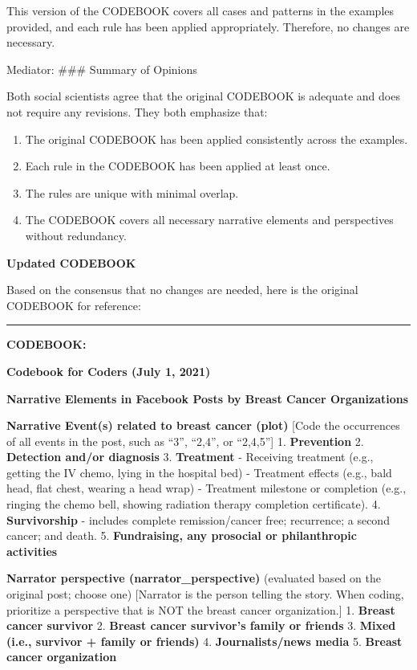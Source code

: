This version of the CODEBOOK covers all cases and patterns in the
examples provided, and each rule has been applied appropriately.
Therefore, no changes are necessary.

Mediator: \#\#\# Summary of Opinions

Both social scientists agree that the original CODEBOOK is adequate and
does not require any revisions. They both emphasize that:

\begin{enumerate}
\def\labelenumi{\arabic{enumi}.}
\tightlist
\item
  The original CODEBOOK has been applied consistently across the
  examples.
\item
  Each rule in the CODEBOOK has been applied at least once.
\item
  The rules are unique with minimal overlap.
\item
  The CODEBOOK covers all necessary narrative elements and perspectives
  without redundancy.
\end{enumerate}

\textbf{Updated CODEBOOK}

Based on the consensus that no changes are needed, here is the original
CODEBOOK for reference:

\begin{center}\rule{0.5\linewidth}{0.5pt}\end{center}

\textbf{CODEBOOK:}

\textbf{Codebook for Coders (July 1, 2021)}

\textbf{Narrative Elements in Facebook Posts by Breast Cancer
Organizations}

\textbf{Narrative Event(s) related to breast cancer (plot)} {[}Code the
occurrences of all events in the post, such as ``3'', ``2,4'', or
``2,4,5''{]} 1. \textbf{Prevention} 2. \textbf{Detection and/or
diagnosis} 3. \textbf{Treatment} - Receiving treatment (e.g., getting
the IV chemo, lying in the hospital bed) - Treatment effects (e.g., bald
head, flat chest, wearing a head wrap) - Treatment milestone or
completion (e.g., ringing the chemo bell, showing radiation therapy
completion certificate). 4. \textbf{Survivorship} - includes complete
remission/cancer free; recurrence; a second cancer; and death. 5.
\textbf{Fundraising, any prosocial or philanthropic activities}

\textbf{Narrator perspective (narrator\_perspective)} (evaluated based
on the original post; choose one) {[}Narrator is the person telling the
story. When coding, prioritize a perspective that is NOT the breast
cancer organization.{]} 1. \textbf{Breast cancer survivor} 2.
\textbf{Breast cancer survivor's family or friends} 3. \textbf{Mixed
(i.e., survivor + family or friends)} 4. \textbf{Journalists/news media}
5. \textbf{Breast cancer organization}


